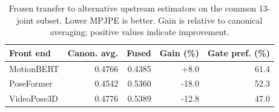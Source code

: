 \begin{table}[t]
\centering
\caption{Frozen transfer to alternative upstream estimators on the common 13-joint subset. Lower MPJPE is better. Gain is relative to canonical averaging; positive values indicate improvement.}
\label{tab:frontend_generalization}
\small
\setlength{\tabcolsep}{4pt}
\begin{tabular}{lrrrr}
\toprule
Front end & Canon. avg. & Fused & Gain (\%) & Gate pref. (\%) \\
\midrule
MotionBERT & 0.4766 & 0.4385 & +8.0 & 61.4 \\
PoseFormer & 0.4542 & 0.5360 & -18.0 & 52.3 \\
VideoPose3D & 0.4776 & 0.5389 & -12.8 & 47.0 \\
\bottomrule
\end{tabular}
\end{table}
